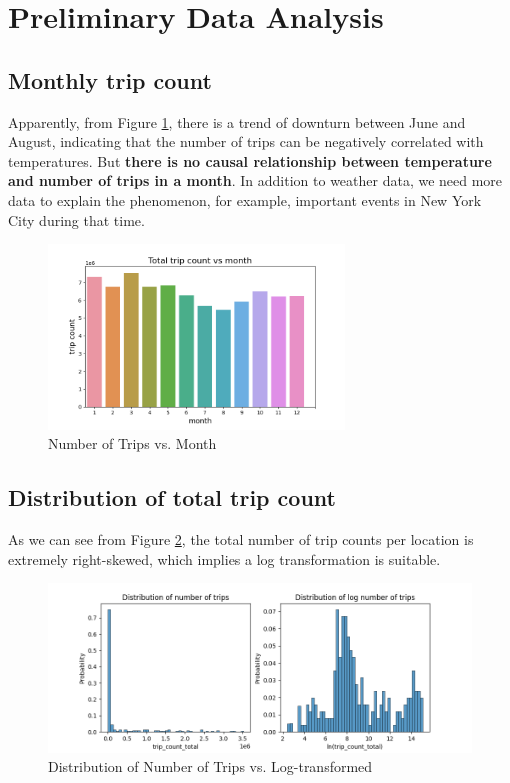 \documentclass[11pt]{article}
\begin{document}
\section{Preliminary Data Analysis}
\subsection{Monthly trip count}
Apparently, from Figure \ref{fig:monthlytripcount}, there is a trend of downturn between June and August, indicating that the number of trips can be negatively correlated with temperatures. But \textbf{there is no causal relationship between temperature and number of trips in a month}. In addition to weather data, we need more data to explain the phenomenon, for example, important events in New York City during that time.
\begin{figure}[h]
    \includegraphics[width=0.7\textwidth]{plots/trip_count_vs_month.png}
    \centering
    \caption{Number of Trips vs. Month}
    \label{fig:monthlytripcount}
\end{figure}
\subsection{Distribution of total trip count}
As we can see from Figure \ref{fig:distributionoftripcount}, the total number of trip counts per location is extremely right-skewed, which implies a log transformation is suitable.
\begin{figure}[h]
    \includegraphics[width=\textwidth]{plots/trip_count_distribution.png}
    \centering
    \caption{Distribution of Number of Trips vs. Log-transformed}
    \label{fig:distributionoftripcount}
\end{figure}
\end{document}
